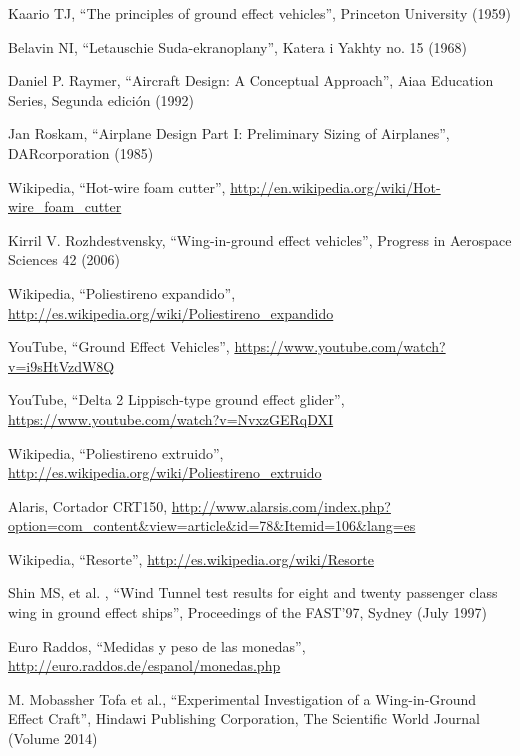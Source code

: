     Kaario TJ,
    “The principles of ground effect vehicles”,
    Princeton University (1959)

    Belavin NI,
    “Letauschie Suda-ekranoplany”,
    Katera i Yakhty no. 15 (1968)

    Daniel P. Raymer,
    “Aircraft Design: A Conceptual Approach”,
    Aiaa Education Series, Segunda edición (1992)

    Jan Roskam,
    “Airplane Design Part I: Preliminary Sizing of Airplanes”,
    DARcorporation (1985)
    
	Wikipedia,
	“Hot-wire foam cutter”,
	\scriptsize \url{http://en.wikipedia.org/wiki/Hot-wire_foam_cutter} \normalsize

	Kirril V. Rozhdestvensky,
	“Wing-in-ground effect vehicles”,
	Progress in Aerospace Sciences 42 (2006)
	
	Wikipedia,
	“Poliestireno expandido”,
	\scriptsize \url{http://es.wikipedia.org/wiki/Poliestireno_expandido} \normalsize

	YouTube,
	“Ground Effect Vehicles”,
	\scriptsize \url{https://www.youtube.com/watch?v=i9sHtVzdW8Q} \normalsize
	
	YouTube,
	“Delta 2 Lippisch-type ground effect glider”,
	\scriptsize \url{https://www.youtube.com/watch?v=NvxzGERqDXI} \normalsize
	
	Wikipedia,
	“Poliestireno extruido”,
	\scriptsize \url{http://es.wikipedia.org/wiki/Poliestireno_extruido} \normalsize

	Alaris,
	Cortador CRT150,
	\scriptsize \url{http://www.alarsis.com/index.php?option=com_content&view=article&id=78&Itemid=106&lang=es} \normalsize

	Wikipedia,
	“Resorte”,
	\scriptsize \url{http://es.wikipedia.org/wiki/Resorte} \normalsize
	
	Shin MS, et al. ,
	“Wind Tunnel test results for eight and twenty passenger class wing in ground effect ships”,
	Proceedings of the FAST’97, Sydney (July 1997)

	Euro Raddos,
	“Medidas y peso de las monedas”,
	\scriptsize \url{http://euro.raddos.de/espanol/monedas.php} \normalsize
	
	M. Mobassher Tofa et al.,
	“Experimental Investigation of a Wing-in-Ground Effect Craft”,
	Hindawi Publishing Corporation, The Scientific World Journal (Volume 2014)
	


	
	